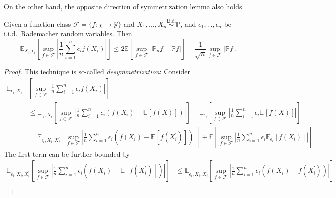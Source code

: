 On the other hand, the opposite direction of \hyperref[lma:symmetrization]{symmetrization lemma} also holds.
\begin{lemma}
	Given a function class \(\mathscr{F} = \{ f\colon \chi \to \mathscr{Y} \} \) and \(X_1, \dots , X_n \overset{\text{i.i.d.} }{\sim } \mathbb{P} \), and \(\epsilon _1, \dots , \epsilon _n\) be i.i.d.\ \hyperref[eg:Rademacher-random-varaible]{Rademacher random variables}. Then
	\[
		\mathbb{E}_{X_i, \epsilon _i}\left[\sup _{f\in \mathscr{F} } \left\vert \frac{1}{n}\sum_{i=1}^{n} \epsilon _i f(X_i) \right\vert \right]
		\leq 2 \mathbb{E}_{}\left[\sup _{f\in \mathscr{F} } \left\vert \mathbb{P} _n f - \mathbb{P} f \right\vert  \right] + \frac{1}{\sqrt{n} } \sup _{f\in \mathscr{F} } \vert \mathbb{P} f \vert.
	\]
\end{lemma}
\begin{proof}
	This technique is so-called \emph{desymmetrization}: Consider
	\[
		\begin{split}
			\mathbb{E}_{\epsilon _i, X_i} & \left[\sup _{f\in \mathscr{F} } \left\vert \frac{1}{n}\sum_{i=1}^{n} \epsilon _i f(X_i) \right\vert \right]                                                                                                \\
			                              & \leq \mathbb{E}_{\epsilon _i, X_i}\left[\sup _{f\in \mathscr{F} } \left\vert \frac{1}{n}\sum_{i=1}^{n} \epsilon _i (f(X_i) - \mathbb{E}_{}\left[f(X) \right] ) \right\vert \right]
			+ \mathbb{E}_{\epsilon _i}\left[\sup _{f\in \mathscr{F} } \left\vert \frac{1}{n}\sum_{i=1}^{n} \epsilon _i \mathbb{E}_{}\left[f(X) \right] \right\vert \right]                                                                             \\
			                              & = \mathbb{E}_{\epsilon _i, X_i, X_i^{\prime} }\left[\sup _{f\in \mathscr{F} } \left\vert \frac{1}{n}\sum_{i=1}^{n} \epsilon _i (f(X_i) - \mathbb{E}_{}\left[f(X_i^{\prime} ) \right] ) \right\vert \right]
			+ \mathbb{E}_{}\left[\sup _{f\in \mathscr{F} } \left\vert \frac{1}{n}\sum_{i=1}^{n} \epsilon _i \mathbb{E}_{\epsilon _i}\left[f(X_i) \right] \right\vert \right].
		\end{split}
	\]
	The first term can be further bounded by
	\[
		\begin{split}
			\mathbb{E}_{\epsilon _i, X_i, X_i^{\prime} }\left[\sup _{f\in \mathscr{F} } \left\vert \frac{1}{n}\sum_{i=1}^{n} \epsilon _i (f(X_i) - \mathbb{E}_{}\left[f(X_i^{\prime} ) \right] ) \right\vert \right]
			 & \leq \mathbb{E}_{\epsilon _i, X_i, X_i^{\prime} }\left[ \sup _{f\in \mathscr{F} } \left\vert \frac{1}{n}\sum_{i=1}^{n} \epsilon _i (f(X_i) - f(X_i^{\prime} )) \right\vert  \right]                             \\

\end{split}\]
\end{proof}

